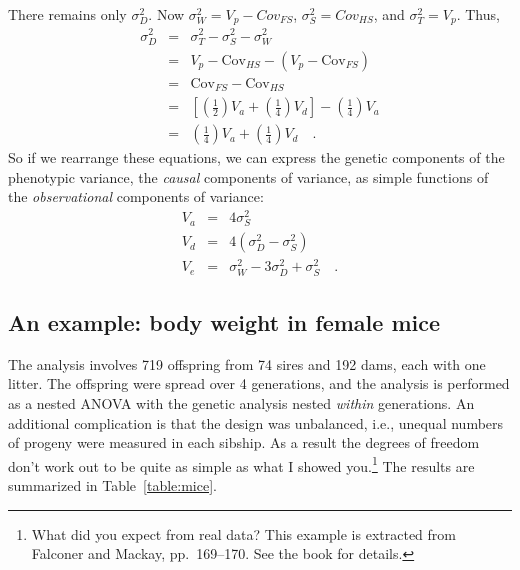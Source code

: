 \documentclass[12pt]{article}
\newcommand{\Cov}{\mbox{Cov}}
\begin{document}
There remains only $\sigma^2_D$.  Now $\sigma^2_W = V_p - Cov_{FS}$,
$\sigma^2_S = Cov_{HS}$, and $\sigma^2_T = V_p$.  Thus,
\begin{eqnarray*}
\sigma^2_D &=& \sigma^2_T - \sigma^2_S - \sigma^2_W \\
           &=& V_p - \Cov_{HS} - (V_p - \Cov_{FS}) \\
           &=& \Cov_{FS} - \Cov_{HS} \\
           &=& \left[
              \left(\frac{1}{2}\right)V_a + \left(\frac{1}{4}\right)V_d 
              \right]
              - \left(\frac{1}{4}\right)V_a \\
           &=& \left(\frac{1}{4}\right)V_a +
           \left(\frac{1}{4}\right)V_d \quad .
\end{eqnarray*}
So if we rearrange these equations, we can express the genetic
components of the phenotypic variance, the {\it causal\/} components
of variance, as simple functions of the {\it observational} components
of variance:
\begin{eqnarray*}
V_a &=& 4\sigma^2_S \\
V_d &=& 4(\sigma^2_D - \sigma^2_S) \\
V_e &=& \sigma^2_W - 3\sigma^2_D + \sigma^2_S \quad .
\end{eqnarray*}

\subsection*{An example: body weight in female mice}

The analysis involves 719 offspring from 74 sires and 192 dams, each
with one litter.  The offspring were spread over 4 generations, and
the analysis is performed as a nested ANOVA with the genetic analysis
nested {\it within\/} generations.  An additional complication is that
the design was unbalanced, i.e., unequal numbers of progeny were
measured in each sibship.  As a result the degrees of freedom don't
work out to be quite as simple as what I showed you.\footnote{What did
you expect from real data? This example is extracted from Falconer and
Mackay, pp.\ 169--170. See the book for details.} The results are
summarized in Table~\ref{table:mice}.
\end{document}
